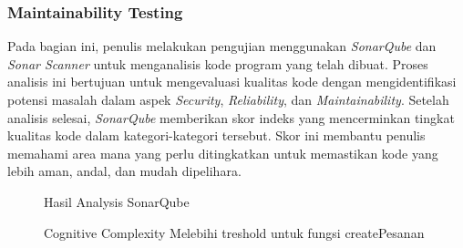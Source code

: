 \newpage

\subsubsection{Maintainability Testing}
Pada bagian ini, penulis melakukan pengujian menggunakan \textit{SonarQube} dan \textit{Sonar Scanner} untuk menganalisis kode program yang telah dibuat. Proses analisis ini bertujuan untuk mengevaluasi kualitas kode dengan mengidentifikasi potensi masalah dalam aspek \textit{Security}, \textit{Reliability}, dan \textit{Maintainability}. Setelah analisis selesai, \textit{SonarQube} memberikan skor indeks yang mencerminkan tingkat kualitas kode dalam kategori-kategori tersebut. Skor ini membantu penulis memahami area mana yang perlu ditingkatkan untuk memastikan kode yang lebih aman, andal, dan mudah dipelihara.
\begin{figure}[H]
  {\par}
  \caption{Hasil Analysis SonarQube}
  \label{maintainability-testing-1}
\end{figure}
\begin{figure}[H]
  {\par}
  \caption{Cognitive Complexity Melebihi treshold untuk fungsi createPesanan}
  \label{maintainability-testing-2}
\end{figure}

